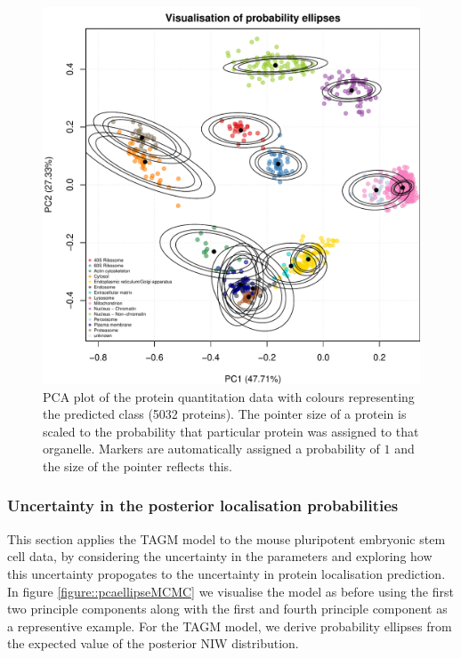 \documentclass[12pt,english]{article}\usepackage[]{graphicx}\usepackage[]{color}
\newenvironment{knitrout}{}{} %
\begin{document}
\begin{figure}[ht]
\begin{knitrout}
\color{fgcolor}

{\centering \includegraphics[width=0.5\linewidth]{figure/unnamed-chunk-4-1} 

}



\end{knitrout}

  \centering
  \caption{PCA plot of the protein quantitation data with colours representing
    the predicted class (5032 proteins). The pointer size of a protein is scaled to
    the probability that particular protein was assigned to that organelle. Markers
are automatically assigned a probability of $1$ and the size of the pointer reflects this.}
  \label{fig:assignmentPCAMAP}
\end{figure}


\clearpage

\subsubsection{Uncertainty in the posterior localisation probabilities}
This section applies the TAGM model to the mouse pluripotent embryonic stem cell data,
by considering the uncertainty in the parameters and exploring how this uncertainty propogates
to the uncertainty in protein localisation prediction.
In figure \ref{figure::pcaellipseMCMC} we visualise the model as before using the first two principle components along with the first and fourth
principle component as a representive example.
For the TAGM model, we derive probability ellipses from the expected value
of the posterior NIW distribution.
\end{document}
